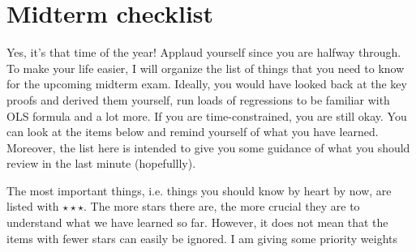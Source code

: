 \documentclass[12pt]{article}
\theoremstyle{definition}
\theoremstyle{property}
\theoremstyle{assumption}
\theoremstyle{example}
\theoremstyle{comment}
\begin{document}
\section{Midterm checklist}
Yes, it's that time of the year! Applaud yourself since you are halfway through. To make your life easier, I will organize the list of things that you need to know for the upcoming midterm exam. Ideally, you would have looked back at the key proofs and derived them yourself, run loads of regressions to be familiar with OLS formula and a lot more. If you are time-constrained, you are still okay. You can look at the items below and remind yourself of what you have learned. Moreover, the list here is intended to give you some guidance of what you should review in the last minute (hopefullly). 
\par\medskip
The most important things, i.e. things you should know by heart by now, are listed with $\star\star\star$. The more stars there are, the more crucial they are to understand what we have learned so far. However, it does not mean that the items with fewer stars can easily be ignored. I am giving some priority weights %
\end{document}
